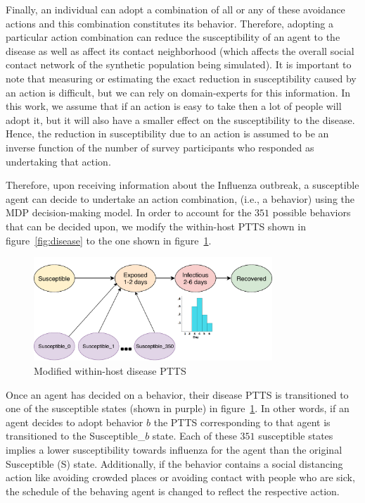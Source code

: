 \documentclass[doublespace]{VTthesis}
\begin{document}
    Finally, an individual can adopt a combination of all or any of these avoidance actions and this combination constitutes its behavior. Therefore, adopting a particular action combination can reduce the susceptibility of an agent to the disease as well as affect its contact neighborhood (which affects the overall social contact network of the synthetic population being simulated). It is important to note that measuring or estimating the exact reduction in susceptibility caused by an action is difficult, but we can rely on domain-experts for this information. In this work, we assume that if an action is easy to take then a lot of people will adopt it, but it will also have a smaller effect on the susceptibility to the disease. Hence, the reduction in susceptibility due to an action is assumed to be an inverse function of the number of survey participants who responded as undertaking that action. 
    
    Therefore, upon receiving information about the Influenza outbreak, a susceptible agent can decide to undertake an action combination, (i.e., a behavior) using the MDP decision-making model. In order to account for the $351$ possible behaviors that can be decided upon, we modify the within-host PTTS shown in figure~\ref{fig:disease} to the one shown in figure~\ref{fig:disease-behavs}.
    
    \begin{figure}
    \centering
    \includegraphics[width=0.8\textwidth]{figures/disease-fsm-behavs.pdf}
    \caption{Modified within-host disease PTTS}
    \label{fig:disease-behavs}
    \end{figure}
    
    Once an agent has decided on a behavior, their disease PTTS is transitioned to one of the susceptible states (shown in purple) in figure~\ref{fig:disease-behavs}. In other words, if an agent decides to adopt behavior $b$ the PTTS corresponding to that agent is transitioned to the Susceptible\_$b$ state. Each of these $351$ susceptible states implies a lower susceptibility towards influenza for the agent than the original Susceptible (S) state. Additionally, if the behavior contains a social distancing action like avoiding crowded places or avoiding contact with people who are sick, the schedule of the behaving agent is changed to reflect the respective action. 
    
\end{document}
